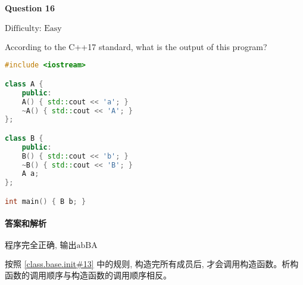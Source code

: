 \documentclass{article}
\begin{document}
	\paragraph*{Question 16} $\boxed{\text{Difficulty: Easy}} $	
	
	According to the C++17 standard, what is the output of this program?	
	
	\begin{lstlisting}[language=C++]
#include <iostream>

class A {
	public:
	A() { std::cout << 'a'; }
	~A() { std::cout << 'A'; }
};

class B {
	public:
	B() { std::cout << 'b'; }
	~B() { std::cout << 'B'; }
	A a;
};

int main() { B b; }
	\end{lstlisting}
	\paragraph*{答案和解析} $\boxed{\text{程序完全正确, 输出abBA}} $
	
	按照 \href{https://timsong-cpp.github.io/cppwp/n4659/class.base.init#13}{[class.base.init\#13]} 中的规则, 构造完所有成员后, 才会调用构造函数。析构函数的调用顺序与构造函数的调用顺序相反。
	
\end{document}
